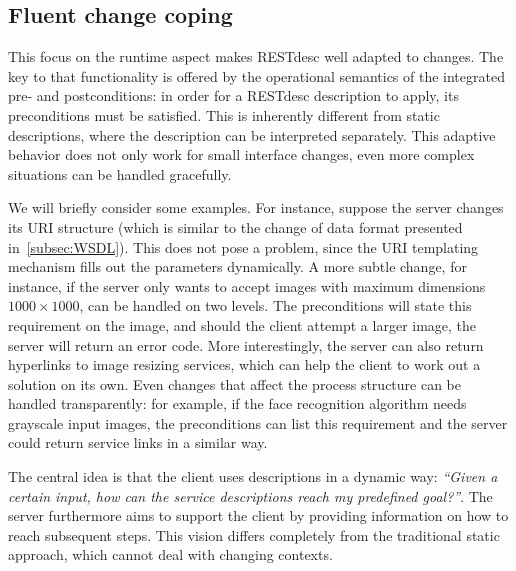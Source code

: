 \documentclass[runningheads,a4paper, twocolumn]{llncs}
\begin{document}
\subsection{Fluent change coping}
This focus on the runtime aspect makes RESTdesc well adapted to changes. The key to that functionality is offered by the operational semantics of the integrated pre- and postconditions: in order for a RESTdesc description to apply, its preconditions must be satisfied. This is inherently different from static descriptions, where the description can be interpreted separately. This adaptive behavior does not only work for small interface changes, even more complex situations can be handled gracefully.

We will briefly consider some examples. For instance, suppose the server changes its URI structure (which is similar to the change of data format presented in~\ref{subsec:WSDL}). This does not pose a problem, since the URI templating mechanism fills out the parameters dynamically. A more subtle change, for instance, if the server only wants to accept images with maximum dimensions $1000 \times 1000$, can be handled on two levels. The preconditions will state this requirement on the image, and should the client attempt a larger image, the server will return an error code. More interestingly, the server can also return hyperlinks to image resizing services, which can help the client to work out a solution on its own. Even changes that affect the process structure can be handled transparently: for example, if the face recognition algorithm needs grayscale input images, the preconditions can list this requirement and the server could return service links in a similar way.

The central idea is that the client uses descriptions in a dynamic way: \emph{``Given a certain input, how can the service descriptions reach my predefined goal?''}. The server furthermore aims to support the client by providing information on how to reach subsequent steps. This vision differs completely from the traditional static approach, which cannot deal with changing contexts.
\end{document}

